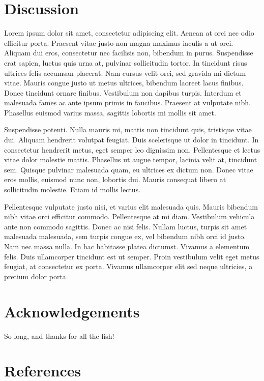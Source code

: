 \documentclass[12pt,]{article}
\begin{document}
\hypertarget{discussion}{%
\section{Discussion}\label{discussion}}

Lorem ipsum dolor sit amet, consectetur adipiscing elit. Aenean at orci
nec odio efficitur porta. Praesent vitae justo non magna maximus iaculis
a ut orci. Aliquam dui eros, consectetur nec facilisis non, bibendum in
purus. Suspendisse erat sapien, luctus quis urna at, pulvinar
sollicitudin tortor. In tincidunt risus ultrices felis accumsan
placerat. Nam cursus velit orci, sed gravida mi dictum vitae. Mauris
congue justo ut metus ultrices, bibendum laoreet lacus finibus. Donec
tincidunt ornare finibus. Vestibulum non dapibus turpis. Interdum et
malesuada fames ac ante ipsum primis in faucibus. Praesent at vulputate
nibh. Phasellus euismod varius massa, sagittis lobortis mi mollis sit
amet.

Suspendisse potenti. Nulla mauris mi, mattis non tincidunt quis,
tristique vitae dui. Aliquam hendrerit volutpat feugiat. Duis
scelerisque ut dolor in tincidunt. In consectetur hendrerit metus, eget
semper leo dignissim non. Pellentesque et lectus vitae dolor molestie
mattis. Phasellus ut augue tempor, lacinia velit at, tincidunt sem.
Quisque pulvinar malesuada quam, eu ultrices ex dictum non. Donec vitae
eros mollis, euismod nunc non, lobortis dui. Mauris consequat libero at
sollicitudin molestie. Etiam id mollis lectus.

Pellentesque vulputate justo nisi, et varius elit malesuada quis. Mauris
bibendum nibh vitae orci efficitur commodo. Pellentesque at mi diam.
Vestibulum vehicula ante non commodo sagittis. Donec ac nisi felis.
Nullam luctus, turpis sit amet malesuada malesuada, sem turpis congue
ex, vel bibendum nibh orci id justo. Nam nec massa nulla. In hac
habitasse platea dictumst. Vivamus a elementum felis. Duis ullamcorper
tincidunt est ut semper. Proin vestibulum velit eget metus feugiat, at
consectetur ex porta. Vivamus ullamcorper elit sed neque ultricies, a
pretium dolor porta.

\hypertarget{acknowledgements}{%
\section{Acknowledgements}\label{acknowledgements}}

So long, and thanks for all the fish!

\hypertarget{references}{%
\section{References}\label{references}}
\end{document}

